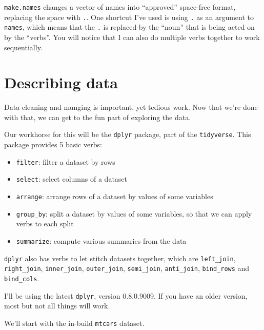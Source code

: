 \documentclass[12pt,letterpaperpaper,openany]{book}
\newenvironment{Shaded}{\begin{snugshade}}{\end{snugshade}}
\newcommand{\KeywordTok}[1]{\textcolor[rgb]{0.13,0.29,0.53}{\textbf{#1}}}
\newcommand{\NormalTok}[1]{#1}
\newcommand{\OperatorTok}[1]{\textcolor[rgb]{0.81,0.36,0.00}{\textbf{#1}}}
\newcommand{\StringTok}[1]{\textcolor[rgb]{0.31,0.60,0.02}{#1}}
\providecommand{\tightlist}{%
  \setlength{\itemsep}{0pt}\setlength{\parskip}{0pt}}
\begin{document}
\texttt{make.names} changes a vector of names into ``approved'' space-free format, replacing
the space with \texttt{.}. One shortcut I've used is using \texttt{.} as an argument to \texttt{names}, which
means that the \texttt{.} is replaced by the ``noun'' that is being acted on by the ``verbs''. You will
notice that I can also do multiple verbs together to work sequentially.

\hypertarget{sec:description}{%
\chapter{Describing data}\label{sec:description}}

Data cleaning and munging is important, yet tedious work. Now that we're done
with that, we can get to the fun part of exploring the data.

Our workhorse for this will be the \texttt{dplyr} package, part of the \texttt{tidyverse}. This
package provides 5 basic verbs:

\begin{itemize}
\tightlist
\item
  \texttt{filter}: filter a dataset by rows
\item
  \texttt{select}: select columns of a dataset
\item
  \texttt{arrange}: arrange rows of a dataset by values of some variables
\item
  \texttt{group\_by}: split a dataset by values of some variables, so that we can apply verbs to each split
\item
  \texttt{summarize}: compute various summaries from the data
\end{itemize}

\texttt{dplyr} also has verbs to let stitch datasets together, which are \texttt{left\_join},
\texttt{right\_join}, \texttt{inner\_join}, \texttt{outer\_join}, \texttt{semi\_join}, \texttt{anti\_join}, \texttt{bind\_rows} and
\texttt{bind\_cols}.

I'll be using the latest \texttt{dplyr}, version 0.8.0.9009. If you have
an older version, most but not all things will work.

We'll start with the in-build \texttt{mtcars} dataset.

\begin{Shaded}
\end{Shaded}
\end{document}

